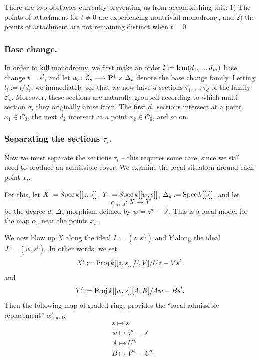 \documentclass[reqno, 10 pt]{article}
\theoremstyle{definition}
\theoremstyle{remark}
\numberwithin{equation}{section}
\numberwithin{thm}{section}
\numberwithin{prop}{section}
\numberwithin{lem}{section}
\numberwithin{cor}{section}
\numberwithin{conj}{section}
\numberwithin{defn}{section}
\renewcommand{\to}{\longrightarrow}
\newcommand{\cC}{{\mathcal C}}
\renewcommand{\P}{{\bf P}}
\newcommand {\from}{{\colon}}
\newcommand{\Spec}{{\text{\rm Spec}\,}}
\newcommand{\Proj}{{\text{\rm Proj}\,}}
\begin{document}
    There are two obstacles currently preventing us from accomplishing this: 1) The points of attachment for $t \neq 0$ are experiencing nontrivial monodromy, and 2) the points of attachment are not remaining distinct when $t=0$.

  \subsubsection{Base change.} 
    In order to kill monodromy, we first make an order $l := {\rm lcm}(d_{1}, ... ,d_{m})$ base change $t = s^{l}$, and let $\alpha_{s} \from \cC_{s} \to \P^{1} \times \Delta_{s}$ denote the base change family.  Letting $l_{i} := l/d_{i}$, we immediately see that we now have $d$ sections $\tau_{1}, ... ,\tau_{d}$ of the family $\cC_{s}$.  Moreover, these sections are naturally grouped according to which multi-section $\sigma_{i}$ they originally arose from. The first $d_{1}$ sections intersect at a point $x_{1} \in C_{0}$, the next $d_{2}$ intersect at a point $x_{2} \in C_{0}$, and so on.

  \subsubsection{Separating the sections $\tau_{i}$.}\label{separatingsections}
    Now we must separate the sections $\tau_{i}$ -- this requires some care, since we still need to produce an admissible cover.  We examine the local situation around each point $x_{i}$. 

    For this, let $X := \Spec k[[z,s]]$, $Y := \Spec k[[w,s]]$, $\Delta_{s} := \Spec k[[s]]$, and let $$\alpha_{\text{local}}: X \to Y$$ be the degree $d_{i}$ $\Delta_{s}$-morphism defined by $w = z^{d_{i}} - s^{l}$. This is a local model for the map $\alpha_{s}$ near the points $x_{i}$.

    We now blow up $X$ along the ideal $I := (z,s^{l_{i}})$ and $Y$ along the ideal $J := (w, s^{l})$. In other words, we set $$X' := \Proj k[[z,s]][U,V]/Uz-Vs^{l_{i}}$$ and $$Y' := \Proj k[[w,s]][A,B]/Aw-Bs^{l}.$$ Then the following map of graded rings provides the ``local admissible replacement'' $\alpha'_{\text{local}}$: 
    \begin{eqnarray} \nonumber
    &s \mapsto s\\ \nonumber
    &w \mapsto z^{d_{i}}-s^{l}\\ \nonumber
    &A \mapsto U^{d_{i}}\\ \nonumber
    &B \mapsto V^{d_{i}} - U^{d_{i}} \nonumber
    \end{eqnarray}
\end{document}
